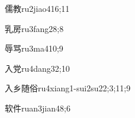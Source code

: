 \begin{verbete}{儒教}{ru2jiao4}{16;11}
\end{verbete}

\begin{verbete}{乳房}{ru3fang2}{8;8}
\end{verbete}

\begin{verbete}{辱骂}{ru3ma4}{10;9}
\end{verbete}

\begin{verbete}{入党}{ru4dang3}{2;10}
\end{verbete}

\begin{verbete}{入乡随俗}{ru4xiang1-sui2su2}{2;3;11;9}
\end{verbete}

\begin{verbete}{软件}{ruan3jian4}{8;6}
\end{verbete}

